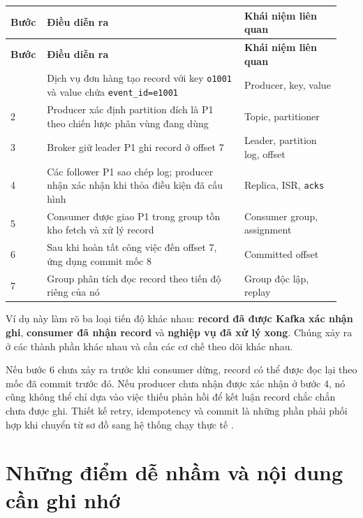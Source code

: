 \begingroup\small
\renewcommand{\arraystretch}{1.23}
\begin{longtable}{@{}p{0.08\linewidth}p{0.58\linewidth}p{0.28\linewidth}@{}}
\toprule
\rowcolor{rowLavender}
\textbf{Bước} & \textbf{Điều diễn ra} & \textbf{Khái niệm liên quan} \\
\midrule
\endfirsthead
\toprule
\rowcolor{rowLavender}
\textbf{Bước} & \textbf{Điều diễn ra} & \textbf{Khái niệm liên quan} \\
\midrule
\endhead
\bottomrule
\endfoot
1 & Dịch vụ đơn hàng tạo record với key \texttt{o1001} và value chứa \texttt{event\_\allowbreak{}id=\allowbreak{}e1001} & Producer, key, value \\
2 & Producer xác định partition đích là P1 theo chiến lược phân vùng đang dùng & Topic, partitioner \\
3 & Broker giữ leader P1 ghi record ở offset 7 & Leader, partition log, offset \\
4 & Các follower P1 sao chép log; producer nhận xác nhận khi thỏa điều kiện đã cấu hình & Replica, ISR, \texttt{acks} \\
5 & Consumer được giao P1 trong group tồn kho fetch và xử lý record & Consumer group, assignment \\
6 & Sau khi hoàn tất công việc đến offset 7, ứng dụng commit mốc 8 & Committed offset \\
7 & Group phân tích đọc record theo tiến độ riêng của nó & Group độc lập, replay \\
\end{longtable}
\endgroup

Ví dụ này làm rõ ba loại tiến độ khác nhau: \textbf{record đã được Kafka xác nhận ghi}, \textbf{consumer đã nhận record} và \textbf{nghiệp vụ đã xử lý xong}. Chúng xảy ra ở các thành phần khác nhau và cần các cơ chế theo dõi khác nhau.


Nếu bước 6 chưa xảy ra trước khi consumer dừng, record có thể được đọc lại theo mốc đã commit trước đó. Nếu producer chưa nhận được xác nhận ở bước 4, nó cũng không thể chỉ dựa vào việc thiếu phản hồi để kết luận record chắc chắn chưa được ghi. Thiết kế retry, idempotency và commit là những phần phải phối hợp khi chuyển từ sơ đồ sang hệ thống chạy thực tế \cite{kafka-producer-api, kafka-design}.


\FloatBarrier
{}
\section{Những điểm dễ nhầm và nội dung cần ghi nhớ}


